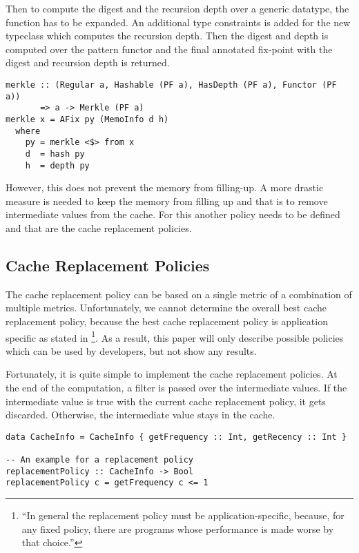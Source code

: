 Then to compute the digest and the recursion depth over a generic datatype, the  function has to be expanded. An additional type constraints  is added for the new typeclass which computes the recursion depth. Then the digest and depth is computed over the pattern functor and the final annotated fix-point with the digest and recursion depth is returned.

\begin{verbatim}
merkle :: (Regular a, Hashable (PF a), HasDepth (PF a), Functor (PF a)) 
       => a -> Merkle (PF a)
merkle x = AFix py (MemoInfo d h)
  where
    py = merkle <$> from x
    d  = hash py
    h  = depth py
\end{verbatim}

However, this does not prevent the memory from filling-up. A more drastic measure is needed to keep the memory from filling up and that is to remove intermediate values from the cache. For this another policy needs to be defined and that are the cache replacement policies.

\subsection{Cache Replacement Policies}

The cache replacement policy can be based on a single metric of a combination of multiple metrics. Unfortunately, we cannot determine the overall best cache replacement policy, because the best cache replacement policy is application specific as stated in \footnote{``In general the replacement policy must be application-specific, because, for any fixed policy, there are programs whose performance is made worse by that choice.''\cite{acar2003selective}}. As a result, this paper will only describe possible policies which can be used by developers, but not show any results.

Fortunately, it is quite simple to implement the cache replacement policies. At the end of the  computation, a filter is passed over the intermediate values. If the intermediate value is true with the current cache replacement policy, it gets discarded. Otherwise, the intermediate value stays in the cache. 

\begin{verbatim}
data CacheInfo = CacheInfo { getFrequency :: Int, getRecency :: Int }

-- An example for a replacement policy
replacementPolicy :: CacheInfo -> Bool
replacementPolicy c = getFrequency c <= 1
\end{verbatim}

